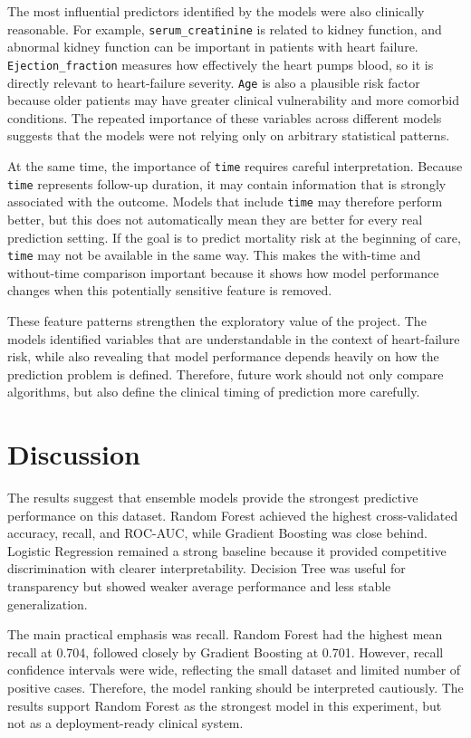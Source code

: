 \documentclass{article}
\begin{document}
The most influential predictors identified by the models were also clinically reasonable. For example, \texttt{serum\_creatinine} is related to kidney function, and abnormal kidney function can be important in patients with heart failure. \texttt{Ejection\_fraction} measures how effectively the heart pumps blood, so it is directly relevant to heart-failure severity. \texttt{Age} is also a plausible risk factor because older patients may have greater clinical vulnerability and more comorbid conditions. The repeated importance of these variables across different models suggests that the models were not relying only on arbitrary statistical patterns.

At the same time, the importance of \texttt{time} requires careful interpretation. Because \texttt{time} represents follow-up duration, it may contain information that is strongly associated with the outcome. Models that include \texttt{time} may therefore perform better, but this does not automatically mean they are better for every real prediction setting. If the goal is to predict mortality risk at the beginning of care, \texttt{time} may not be available in the same way. This makes the with-time and without-time comparison important because it shows how model performance changes when this potentially sensitive feature is removed.

These feature patterns strengthen the exploratory value of the project. The models identified variables that are understandable in the context of heart-failure risk, while also revealing that model performance depends heavily on how the prediction problem is defined. Therefore, future work should not only compare algorithms, but also define the clinical timing of prediction more carefully.

\section{Discussion}

The results suggest that ensemble models provide the strongest predictive performance on this dataset. Random Forest achieved the highest cross-validated accuracy, recall, and ROC-AUC, while Gradient Boosting was close behind. Logistic Regression remained a strong baseline because it provided competitive discrimination with clearer interpretability. Decision Tree was useful for transparency but showed weaker average performance and less stable generalization.

The main practical emphasis was recall. Random Forest had the highest mean recall at 0.704, followed closely by Gradient Boosting at 0.701. However, recall confidence intervals were wide, reflecting the small dataset and limited number of positive cases. Therefore, the model ranking should be interpreted cautiously. The results support Random Forest as the strongest model in this experiment, but not as a deployment-ready clinical system.
\end{document}
